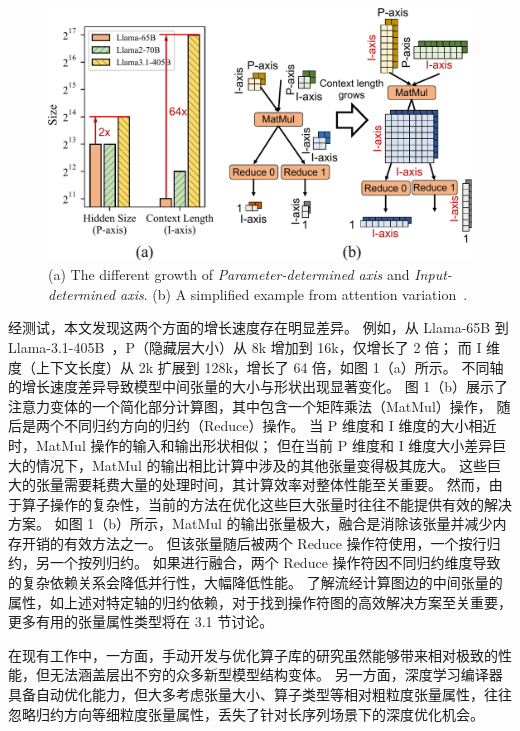 \begin{figure}[ht]
    \centering
    \includegraphics[width=0.6\linewidth]{figures/flashtensor/intro_workload-crop.pdf}
    \caption{(a) The different growth of \textit{Parameter-determined axis} and \textit{Input-determined axis}. (b) A simplified example from attention variation~\cite{zhang2024h2o}.}
    \label{fig:flashtensor-larger_workload}
\end{figure}

经测试，本文发现这两个方面的增长速度存在明显差异。
例如，从 Llama-65B 到 Llama-3.1-405B~\cite{touvron2023llama, touvron2023llama2, dubey2024llama3}，P（隐藏层大小）从 8k 增加到 16k，仅增长了 2 倍；
而 I 维度（上下文长度）从 2k 扩展到 128k，增长了 64 倍，如图 1（a）所示。
不同轴的增长速度差异导致模型中间张量的大小与形状出现显著变化。
图 1（b）展示了注意力变体的一个简化部分计算图，其中包含一个矩阵乘法（MatMul）操作，
随后是两个不同归约方向的归约（Reduce）操作。
当 P 维度和 I 维度的大小相近时，MatMul 操作的输入和输出形状相似；
但在当前 P 维度和 I 维度大小差异巨大的情况下，MatMul 的输出相比计算中涉及的其他张量变得极其庞大。
这些巨大的张量需要耗费大量的处理时间，其计算效率对整体性能至关重要。
然而，由于算子操作的复杂性，当前的方法在优化这些巨大张量时往往不能提供有效的解决方案。
如图 1（b）所示，MatMul 的输出张量极大，融合是消除该张量并减少内存开销的有效方法之一。
但该张量随后被两个 Reduce 操作符使用，一个按行归约，另一个按列归约。
如果进行融合，两个 Reduce 操作符因不同归约维度导致的复杂依赖关系会降低并行性，大幅降低性能。
了解流经计算图边的中间张量的属性，如上述对特定轴的归约依赖，对于找到操作符图的高效解决方案至关重要，更多有用的张量属性类型将在 3.1 节讨论。

在现有工作中，一方面，手动开发与优化算子库的研究虽然能够带来相对极致的性能，但无法涵盖层出不穷的众多新型模型结构变体。
另一方面，深度学习编译器具备自动优化能力，但大多考虑张量大小、算子类型等相对粗粒度张量属性，往往忽略归约方向等细粒度张量属性，丢失了针对长序列场景下的深度优化机会。

